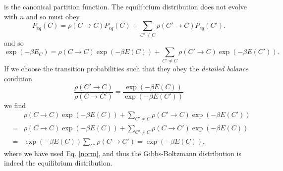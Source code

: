 \documentclass[11pt]{report}
\begin{document}
is the canonical partition function. The equilibrium distribution does not evolve with $n$ and so must obey
\begin{equation}
P_{eq}(C) =  \rho(C\to C)P_{eq}(C) + \sum_{C'\neq C} \rho(C'\to C)P_{eq}(C').
\end{equation}
and so 
\begin{equation}
\exp(-\beta E_C) =  \rho(C\to C)\exp(-\beta E(C))+ \sum_{C'\neq C} \rho(C'\to C)\exp(-\beta E(C')).
\end{equation}
If we choose the transition probabilities such that they obey the {\em detailed balance} condition
\begin{equation}
\boxed{
\frac{\rho(C'\to C)}{\rho(C \to C')} = \frac{\exp(-\beta E(C))}{\exp(-\beta E(C'))}}
\end{equation} 
we find
\begin{eqnarray}
&&\rho(C\to C)\exp(-\beta E(C))+ \sum_{C'\neq C} \rho(C'\to C)\exp(-\beta E(C'))\nonumber\\ &=&
\rho(C\to C)\exp(-\beta E(C))+\sum_{C'\neq C} \rho(C\to C')\exp(-\beta E(C))\\ \nonumber
&=& \exp(-\beta E(C)) \sum_{C'}\rho(C\to C') = \exp(-\beta E(C)),
\end{eqnarray}
where we have used Eq. \eqref{norm},
and thus the Gibbs-Boltzmann distribution is indeed the equilibrium distribution.
\end{document}
